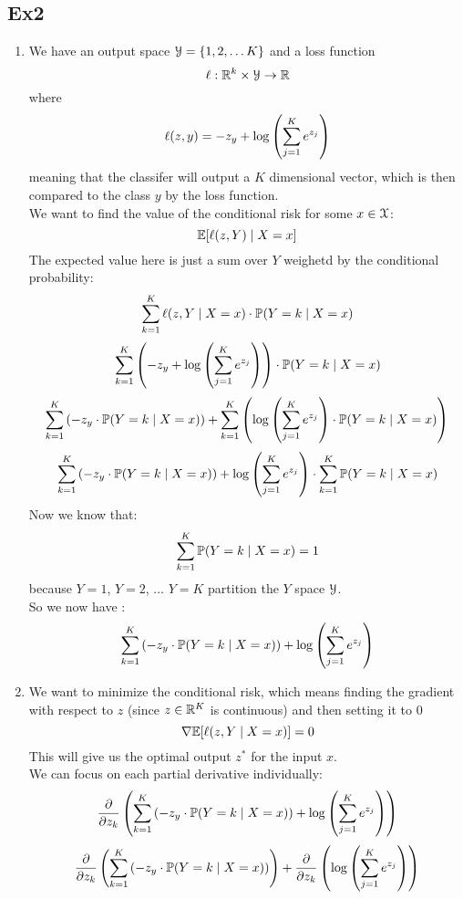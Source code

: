 \documentclass[12pt]{article}
\begin{document}
\newpage

\subsection*{Ex2}
\begin{enumerate}[label=\alph*)]
    \item 
    We have an output space
    $\mathcal{Y} = \{ 1, 2, \dots K \}$
    and a loss function
    \[ \ell: \mathbb{R}^k \times \mathcal{Y} \to \mathbb{R} \]
    where
    \[ \ell(z, y)
    = -z_y + \log\left( \sum_{j=1}^K e^{z_j}  \right) \]
    meaning that the classifer will output
    a $K$ dimensional vector,
    which is then compared to the class $y$
    by the loss function. \\
    We want to find the value of
    the conditional risk for some 
    $x \in \mathcal{X}$: \\
    \[ \mathbb{E}[\ell(z, Y) \mid X = x] \]
    The expected value here is just a sum
    over $Y$ weighetd by the conditional
    probability:
    \[ \sum_{k = 1}^K \ell(z, Y \mid X = x)
    \cdot \mathbb{P}(Y = k \mid X = x) \]
    \[ \sum_{k = 1}^K
    \left( -z_y + \log\left( \sum_{j=1}^K e^{z_j} \right) \right)
    \cdot \mathbb{P}(Y = k \mid X = x) \]
    \[ \sum_{k = 1}^K \left( -z_y
    \cdot \mathbb{P}(Y = k \mid X = x) \right)
    + \sum_{k = 1}^K
    \left( \log\left( \sum_{j=1}^K e^{z_j} \right)
    \cdot \mathbb{P}(Y = k \mid X = x) \right) \]
    \[ \sum_{k = 1}^K \left( -z_y
    \cdot \mathbb{P}(Y = k \mid X = x) \right)
    + \log\left( \sum_{j=1}^K e^{z_j} \right)
    \cdot
    \sum_{k = 1}^K \mathbb{P}(Y = k \mid X = x) \]
    Now we know that:
    \[ \sum_{k = 1}^K
    \mathbb{P}(Y = k \mid X = x) = 1 \]
    because $Y = 1$, $Y = 2$,
    $\dots$ $Y = K$
    partition the $Y$ space $\mathcal{Y}$. \\
    So we now have :
    \[ \sum_{k = 1}^K \left( -z_y
    \cdot \mathbb{P}(Y = k \mid X = x) \right)
    + \log\left( \sum_{j=1}^K e^{z_j} \right) \]
    \item 
    We want to minimize the conditional
    risk, which means finding the gradient
    with respect to $z$
    (since $z \in \mathbb{R}^K$ is continuous)
    and then setting it to 0
    \[ \nabla \mathbb{E}[\ell(z, Y \mid X = x)] = 0 \]
    This will give us the optimal
    output $z^*$ for the input $x$. \\
    We can focus on each partial
    derivative individually:
    \[\dfrac{\partial }{\partial z_k}
    \left(  \sum_{k = 1}^K \left( -z_y
    \cdot \mathbb{P}(Y = k \mid X = x) \right)
    + \log\left( \sum_{j=1}^K e^{z_j} \right) \right) \]
    \[\dfrac{\partial }{\partial z_k}
    \left(  \sum_{k = 1}^K \left( -z_y
    \cdot \mathbb{P}(Y = k \mid X = x) \right) \right) 
    + \dfrac{\partial }{\partial z_k}
    \left( \log\left( \sum_{j=1}^K e^{z_j} \right) \right) \]

\end{enumerate}
\end{document}
